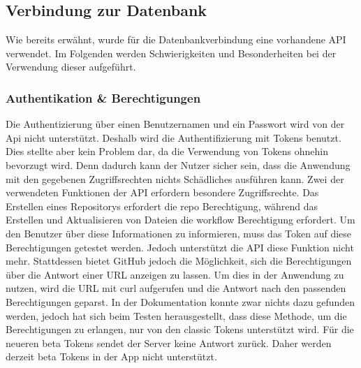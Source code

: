 \subsection{Verbindung zur Datenbank} %
Wie bereits erwähnt, wurde für die Datenbankverbindung eine vorhandene API verwendet. Im Folgenden werden Schwierigkeiten und Besonderheiten bei der Verwendung dieser aufgeführt.
%
%
%
%
%
%
%
\subsubsection{Authentikation \& Berechtigungen}%
%
Die Authentizierung über einen Benutzernamen und ein Passwort wird von der Api nicht unterstützt\cite{imp_github_userPasswordAuthentication}. Deshalb wird die Authentifizierung mit Tokens benutzt. %
Dies stellte aber kein Problem dar, da die Verwendung von Tokens ohnehin bevorzugt wird. Denn dadurch kann der Nutzer sicher sein, dass die Anwendung mit den gegebenen Zugriffsrechten nichts Schädliches ausführen kann.%
%
\newline%
Zwei der verwendeten Funktionen der API erfordern besondere Zugriffsrechte. Das Erstellen eines Repositorys erfordert die \glqq repo\grqq{} Berechtigung\cite{imp_github_createRepo}, während das Erstellen und Aktualisieren von Dateien die \glqq workflow\grqq{} Berechtigung erfordert\cite{imp_github_createFile}. Um den Benutzer über diese Informationen zu informieren, muss das Token auf diese Berechtigungen getestet werden. Jedoch unterstützt die API diese Funktion nicht mehr\cite{imp_github_tokensScopeDiscontinued}. Stattdessen bietet GitHub jedoch die Möglichkeit, sich die Berechtigungen über die Antwort einer URL anzeigen zu lassen\cite{imp_github_tokensScopeCurl}. Um dies in der Anwendung zu nutzen, wird die URL mit curl aufgerufen und die Antwort nach den passenden Berechtigungen geparst.%
\newline%
In der Dokumentation konnte zwar nichts dazu gefunden werden, jedoch hat sich beim Testen herausgestellt, dass diese Methode, um die Berechtigungen zu erlangen, nur von den \glqq classic Tokens\grqq{} unterstützt wird. Für die neueren \glqq beta Tokens\grqq{} sendet der Server keine Antwort zurück. Daher werden derzeit \glqq beta Tokens\grqq{} in der App nicht unterstützt.%
